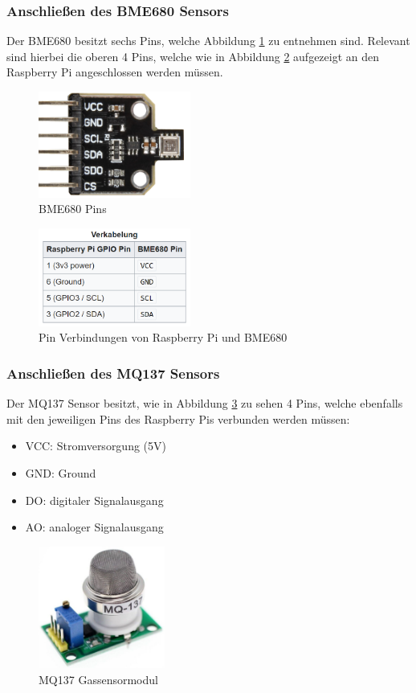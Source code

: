 \documentclass[conference]{IEEEtran}
\begin{document}
\subsubsection{Anschließen des BME680 Sensors} 


Der BME680 besitzt sechs Pins, welche Abbildung \ref{bme_pins} zu entnehmen sind. Relevant sind hierbei die oberen 4 Pins, welche wie in Abbildung \ref{verkabelung_bme} aufgezeigt an den Raspberry Pi angeschlossen werden müssen. \cite{bme_anschluss}
\begin{figure}[H]
	\centering
	\includegraphics[width=50mm]{fig/bme_pins.png}
	\caption{BME680 Pins}
	\label{bme_pins}
\end{figure}
\begin{figure}[H]
	\centerline{\includegraphics[width=50mm]{fig/verkabelung_bme.png}}
	\caption{Pin Verbindungen von Raspberry Pi und BME680}
	\label{verkabelung_bme}
\end{figure}

\subsubsection{Anschließen des MQ137 Sensors} 

Der MQ137 Sensor besitzt, wie in Abbildung \ref{mq137_pins} zu sehen 4 Pins, welche ebenfalls mit den jeweiligen Pins des Raspberry Pis verbunden werden müssen:
\begin{itemize}
	\item VCC: Stromversorgung (5V)
	\item GND: Ground
	\item DO: digitaler Signalausgang
	\item AO: analoger Signalausgang
\end{itemize}
\begin{figure}[H]
	\centerline{\includegraphics[height=40mm]{fig/mq137_pins.png}}
	\caption{MQ137 Gassensormodul}
	\label{mq137_pins}
\end{figure}
\end{document}
